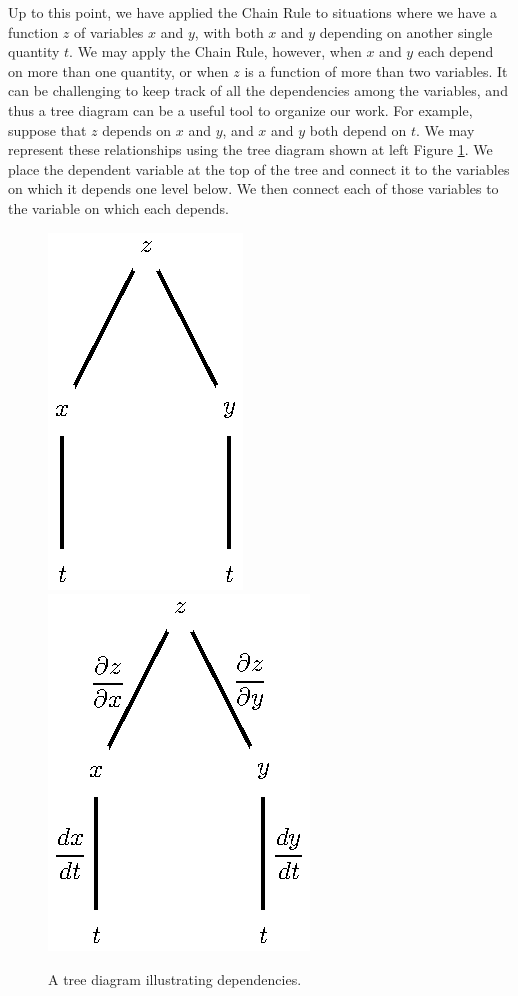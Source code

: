 Up to this point, we have applied the Chain Rule to situations where
we have a function $z$ of variables $x$ and $y$, with both $x$ and $y$ depending on another single
quantity $t$.  We may apply the Chain Rule, however, when $x$ and $y$ each
depend on more than one quantity, or when $z$ is a function of more than two variables. It can be challenging to keep track
of all the dependencies among the variables, and thus a tree diagram can be a useful tool to organize our work. 
For example, suppose that $z$ depends on $x$ and $y$, and $x$ and $y$
both depend on $t$.  We may represent these relationships using the tree
diagram shown at left Figure \ref{F:10.5.tree.1}.  We place the dependent
variable at the top of the tree and connect it to the variables on
which it depends one level below.  We then connect each of those variables to the variable on which each depends.

\begin{figure}[ht]
  \begin{center}
    \includegraphics{figures/fig_10_5_tree_3.eps} \hspace{0.5in} \includegraphics{figures/fig_10_5_tree_1.eps}
  \end{center}
  \caption{A tree diagram illustrating dependencies.}
  \label{F:10.5.tree.1}
\end{figure}

